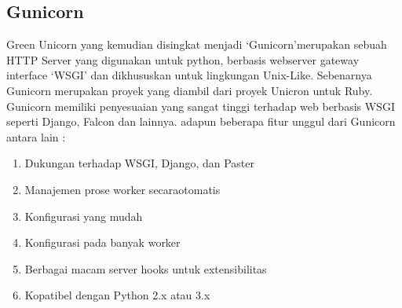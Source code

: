 \subsection{Gunicorn}
\par Green Unicorn yang kemudian disingkat menjadi `Gunicorn'merupakan sebuah HTTP Server yang digunakan untuk python, berbasis webserver gateway interface `WSGI' dan dikhususkan 
untuk lingkungan Unix-Like. Sebenarnya Gunicorn merupakan proyek yang diambil dari proyek Unicron untuk Ruby. Gunicorn memiliki penyesuaian yang sangat tinggi terhadap web berbasis WSGI 
seperti Django, Falcon dan lainnya. adapun beberapa fitur unggul dari Gunicorn antara lain :


\begin{enumerate}
\item Dukungan terhadap WSGI, Django, dan Paster
\item Manajemen prose worker secaraotomatis
\item Konfigurasi yang mudah
\item Konfigurasi pada banyak worker
\item Berbagai macam server hooks untuk extensibilitas
\item Kopatibel dengan Python 2.x atau 3.x
\end{enumerate}
